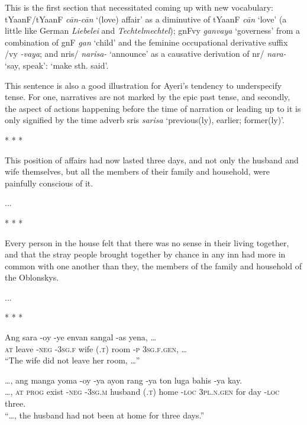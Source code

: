 \documentclass[12pt,paper=letter]{scrartcl}
\newcommand{\fw}[1]{\textit{#1}} %
\newcommand{\q}[1]{\enquote{#1}} %
\newcommand{\qq}[1]{\enquote*{#1}} %
\newcommand{\divider}{\vspace{0.5\baselineskip} \centerline{* * *} \vspace{0.5\baselineskip}}
\newcommand{\mor}[1]{\textsc{\lowercase{#1}}}
\newcommand{\ayr}[1]{{\Tagati #1}}
\begin{document}
This is the first section that necessitated coming up with new vocabulary:
\ayr{tYaanF/tYaanF} \fw{cān-cān} \qq{(love) affair} as a diminutive of 
\ayr{tYaanF} \fw{cān} \qq{love} (a little like German \fw{Liebelei} and 
\fw{Techtelmechtel}); \ayr{gnFvy} \fw{ganvaya} \qq{governess} from a 
combination of \ayr{gnF} \fw{gan} \qq{child} and the feminine occupational 
derivative suffix \ayr{/vy} \fw{-vaya}; and \ayr{nris/} \fw{narisa-} 
\qq{announce} as a causative derivation of \ayr{nr/} \fw{nara-} \qq{say, 
speak}: \qq{make sth. said}.

This sentence is also a good illustration for Ayeri's tendency to underspecify
tense. For one, narratives are not marked by the epic past tense, and secondly,
the aspect of actions happening before the time of narration or leading up to it
is only signified by the time adverb \ayr{sris} \fw{sarisa} \qq{previous(ly), 
earlier; former(ly)}.

\divider

This position of affairs had now lasted three days, and not only the husband and wife themselves, but all the members of their family and household, were painfully conscious of it.

\begin{exe}
    \ex ...
\end{exe}

\divider

Every person in the house felt that there was no sense in their living together, and that the stray people brought together by chance in any inn had more in common with one another than they, the members of the family and household of the Oblonskys.

\begin{exe}
    \ex ...
\end{exe}

\divider

\begin{exe}
    \ex
    \begin{xlist}
	\ex \gll Ang sara -oy -ye envan {} sangal -as yena, … \\
	\mor{AT} leave \mor{-NEG} \mor{-3SG.F} wife \mor{(.T)} room \mor{-P} 
	    \mor{3SG.F.GEN}, … \\
	\glt \q{The wife did not leave her room, …}
	    
	\ex \gll …, ang manga yoma -oy -ya ayon {} rang -ya ton luga bahis -ya 
	    kay. \\
	…, \mor{AT} \mor{PROG} exist \mor{-NEG} \mor{-3SG.M} husband \mor{(.T)} 
	    home \mor{-LOC} \mor{3PL.N.GEN} for day \mor{-LOC} three. \\
	\glt \q{…, the husband had not been at home for three days.}
    \end{xlist}
\end{exe}
\end{document}

